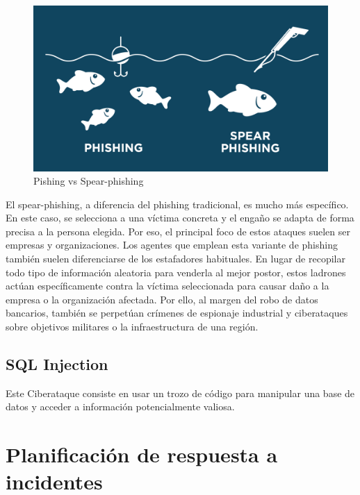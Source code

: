 \begin{figure}[tphb]
  		   \centering
     		   \includegraphics[width=5in]{spear-phishing.png}
  		   \caption{Pishing vs Spear-phishing \cite{armor}}
  		   \label{img:spear-pishing}
\end{figure}

El spear-phishing, a diferencia del phishing tradicional, es mucho más específico. En este caso, se selecciona a una víctima concreta y el engaño se adapta de forma precisa a la 
persona elegida. Por eso, el principal foco de estos ataques suelen ser empresas y organizaciones. Los agentes que emplean esta variante de phishing 
también suelen diferenciarse de los estafadores habituales. En lugar de recopilar todo tipo de información aleatoria para venderla al mejor postor, estos
ladrones actúan específicamente contra la víctima seleccionada para causar daño a la empresa o la organización afectada. Por ello, al margen del robo de 
datos bancarios, también se perpetúan crímenes de espionaje industrial y ciberataques sobre objetivos militares o la infraestructura de una región.

\section{SQL Injection}
\label{sec:sql-injection}

Este Ciberataque consiste en usar un trozo de código para manipular una base de datos y acceder a información potencialmente valiosa.


\chapter{Planificación de respuesta a incidentes}
\label{cha:planificacion-de-respuesta}



